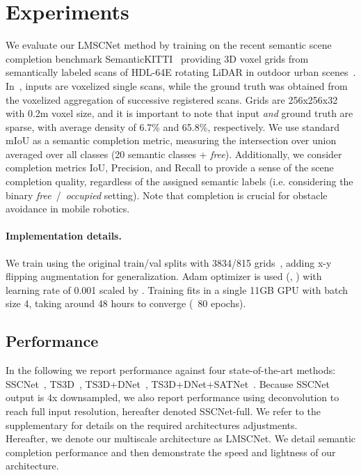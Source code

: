 \section{Experiments} \label{sec:experiments}
\label{sec:exp_metrics}
We evaluate our LMSCNet method by training on the recent semantic scene completion benchmark SemanticKITTI~\cite{Behley2019SemanticKITTIAD} providing 3D voxel grids from semantically labeled scans of HDL-64E rotating LiDAR in outdoor urban scenes~\cite{geiger2012we}. 
In~\cite{Behley2019SemanticKITTIAD}, inputs are voxelized single scans, while the ground truth was obtained from the voxelized aggregation of successive registered scans. Grids are 256x256x32 with 0.2m voxel size, and it is important to note that input \textit{and} ground truth are sparse, with average density of 6.7\% and 65.8\%, respectively. 
We use standard mIoU as a semantic completion metric, measuring the intersection over union averaged over all classes (20 semantic classes + \textit{free}). Additionally, we consider completion metrics IoU, Precision, and Recall to provide a sense of the scene completion quality, regardless of the assigned semantic labels (i.e. considering the binary \textit{free}~/~\textit{occupied} setting). Note that completion is crucial for obstacle avoidance in mobile robotics.








\paragraph{Implementation details.} 
We train using the original train/val splits with 3834/815 grids~\cite{Behley2019SemanticKITTIAD}, adding x-y flipping augmentation for generalization.
Adam optimizer is used (, ) with learning rate of 0.001 scaled by . Training fits in a single 11GB GPU with batch size 4, taking around 48 hours to converge (~80 epochs).



\subsection{Performance}\label{sec:exp-perf}
In the following we report performance against four state-of-the-art methods: SSCNet~\cite{Song2017SemanticSC}, TS3D~\cite{Garbade2019TwoS3}, TS3D+DNet~\cite{Behley2019SemanticKITTIAD}, TS3D+DNet+SATNet~\cite{Behley2019SemanticKITTIAD}. Because SSCNet output is 4x downsampled, we also report performance using deconvolution to reach full input resolution, hereafter denoted SSCNet-full. We refer to the supplementary for details on the required architectures adjustments.\\
\noindent{}Hereafter, we denote our multiscale architecture as \mbox{LMSCNet}. We detail semantic completion performance and then demonstrate the speed and lightness of our architecture. 

